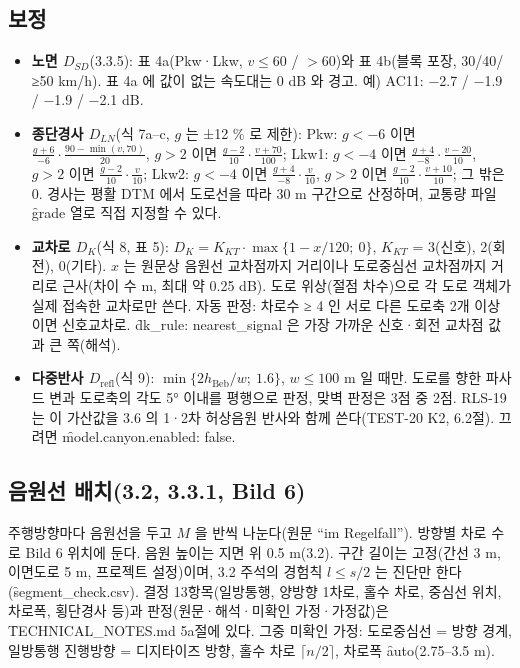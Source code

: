 \documentclass[10.5pt,a4paper]{article}
\begin{document}
\subsection{보정}
\begin{itemize}
\item \textbf{노면 $D_{SD}$}(3.3.5): 표 4a(Pkw·Lkw, $v \le 60$ / $> 60$)와 표 4b(블록 포장, 30/40/≥50 km/h). 표 4a 에 값이 없는 속도대는 0 dB 와 경고. 예) AC11: −2.7 / −1.9 / −1.9 / −2.1 dB.
\item \textbf{종단경사 $D_{LN}$}(식 7a–c, $g$ 는 ±12 \% 로 제한):
Pkw: $g<-6$ 이면 $\frac{g+6}{-6}\cdot\frac{90-\min(v,70)}{20}$, $g>2$ 이면 $\frac{g-2}{10}\cdot\frac{v+70}{100}$;
Lkw1: $g<-4$ 이면 $\frac{g+4}{-8}\cdot\frac{v-20}{10}$, $g>2$ 이면 $\frac{g-2}{10}\cdot\frac{v}{10}$;
Lkw2: $g<-4$ 이면 $\frac{g+4}{-8}\cdot\frac{v}{10}$, $g>2$ 이면 $\frac{g-2}{10}\cdot\frac{v+10}{10}$; 그 밖은 0. 경사는 평활 DTM 에서 도로선을 따라 30 m 구간으로 산정하며, 교통량 파일 \f{grade} 열로 직접 지정할 수 있다.
\item \textbf{교차로 $D_K$}(식 8, 표 5): $D_K = K_{KT}\cdot\max\{1 - x/120;\ 0\}$, $K_{KT}$ = 3(신호), 2(회전), 0(기타). $x$ 는 원문상 음원선 교차점까지 거리이나 도로중심선 교차점까지 거리로 근사(차이 수 m, 최대 약 0.25 dB). 도로 위상(절점 차수)으로 각 도로 객체가 실제 접속한 교차로만 쓴다. 자동 판정: 차로수 ≥ 4 인 서로 다른 도로축 2개 이상이면 신호교차로. \f{dk\_rule: nearest\_signal} 은 가장 가까운 신호·회전 교차점 값과 큰 쪽(해석).
\item \textbf{다중반사 $D_\mathrm{refl}$}(식 9): $\min\{2h_\mathrm{Beb}/w;\ 1.6\}$, $w \le 100$ m 일 때만. 도로를 향한 파사드 변과 도로축의 각도 5° 이내를 평행으로 판정, 맞벽 판정은 3점 중 2점. RLS-19 는 이 가산값을 3.6 의 1·2차 허상음원 반사와 함께 쓴다(TEST-20 K2, 6.2절). 끄려면 \f{model.canyon.enabled: false}.
\end{itemize}

\subsection{음원선 배치(3.2, 3.3.1, Bild 6)}
주행방향마다 음원선을 두고 $M$ 을 반씩 나눈다(원문 ``im Regelfall''). 방향별 차로 수로 Bild 6 위치에 둔다. 음원 높이는 지면 위 0.5 m(3.2). 구간 길이는 고정(간선 3 m, 이면도로 5 m, 프로젝트 설정)이며, 3.2 주석의 경험칙 $l \le s/2$ 는 진단만 한다(\f{segment\_check.csv}). 결정 13항목(일방통행, 양방향 1차로, 홀수 차로, 중심선 위치, 차로폭, 횡단경사 등)과 판정(원문·해석·미확인 가정·가정값)은 \f{TECHNICAL\_NOTES.md} 5a절에 있다. 그중 미확인 가정: 도로중심선 = 방향 경계, 일방통행 진행방향 = 디지타이즈 방향, 홀수 차로 $\lceil n/2\rceil$, 차로폭 \f{auto}(2.75–3.5 m).
\end{document}
